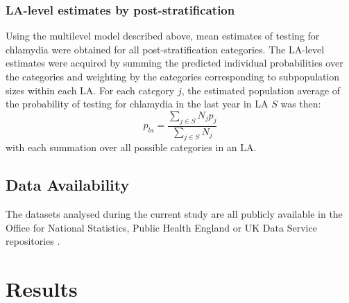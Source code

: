 \documentclass[fleqn,10pt]{wlscirep}
\begin{document}
\subsubsection*{LA-level estimates by post-stratification}
Using the multilevel model described above, mean estimates of testing for chlamydia were obtained for all post-stratification categories. The LA-level estimates were acquired by summing the predicted individual probabilities over the categories and weighting by the categories corresponding to subpopulation sizes within each LA.
For each category $j$, the estimated population average of the probability of testing for chlamydia in the last year in LA $S$ was then:
\begin{displaymath}
p_{la} = \frac{\sum_{j\in S} N_j p_j}{\sum_{j\in S} N_j}
\end{displaymath}
with each summation over all possible categories in an LA.

\subsection*{Data Availability}

The datasets analysed during the current study are all publicly available in the Office for National Statistics, Public Health England or UK Data Service repositories \cite{OfficeforNationalStatistics2011,OfficeforNationalStatistics2011a,DepartmentforCommunitiesandLocalGovernment,ONS_cesnsusdata,ONS_conceptions,ONS_urbanrural,PublicHealthEngland,Johnson2017}.

\section*{Results}
\end{document}
